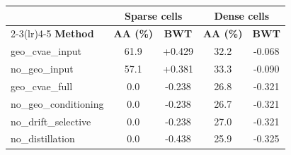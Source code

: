 \begin{tabular}{lcccc}
\toprule
& \multicolumn{2}{c}{\textbf{Sparse cells}} & \multicolumn{2}{c}{\textbf{Dense cells}} \\
\cmidrule(lr){2-3}\cmidrule(lr){4-5}
\textbf{Method} & \textbf{AA (\%)} & \textbf{BWT} & \textbf{AA (\%)} & \textbf{BWT} \\
\midrule
geo_cvae_input & 61.9 & +0.429 & 32.2 & -0.068 \\
no_geo_input & 57.1 & +0.381 & 33.3 & -0.090 \\
geo_cvae_full & 0.0 & -0.238 & 26.8 & -0.321 \\
no_geo_conditioning & 0.0 & -0.238 & 26.7 & -0.321 \\
no_drift_selective & 0.0 & -0.238 & 27.0 & -0.321 \\
no_distillation & 0.0 & -0.438 & 25.9 & -0.325 \\
\bottomrule
\end{tabular}
